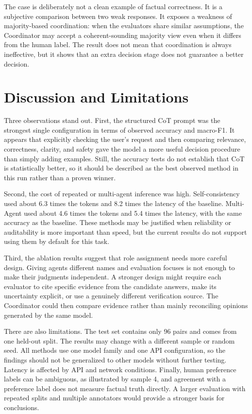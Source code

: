 \documentclass[10pt]{article}
\begin{document}
The case is deliberately not a clean example of factual correctness. It is a subjective comparison between two weak responses. It exposes a weakness of majority-based coordination: when the evaluators share similar assumptions, the Coordinator may accept a coherent-sounding majority view even when it differs from the human label. The result does not mean that coordination is always ineffective, but it shows that an extra decision stage does not guarantee a better decision.

\section{Discussion and Limitations}
Three observations stand out. First, the structured CoT prompt was the strongest single configuration in terms of observed accuracy and macro-F1. It appears that explicitly checking the user's request and then comparing relevance, correctness, clarity, and safety gave the model a more useful decision procedure than simply adding examples. Still, the accuracy tests do not establish that CoT is statistically better, so it should be described as the best observed method in this run rather than a proven winner.

Second, the cost of repeated or multi-agent inference was high. Self-consistency used about 6.3 times the tokens and 8.2 times the latency of the baseline. Multi-Agent used about 4.6 times the tokens and 5.4 times the latency, with the same accuracy as the baseline. These methods may be justified when reliability or auditability is more important than speed, but the current results do not support using them by default for this task.

Third, the ablation results suggest that role assignment needs more careful design. Giving agents different names and evaluation focuses is not enough to make their judgments independent. A stronger design might require each evaluator to cite specific evidence from the candidate answers, make its uncertainty explicit, or use a genuinely different verification source. The Coordinator could then compare evidence rather than mainly reconciling opinions generated by the same model.

There are also limitations. The test set contains only 96 pairs and comes from one held-out split. The results may change with a different sample or random seed. All methods use one model family and one API configuration, so the findings should not be generalized to other models without further testing. Latency is affected by API and network conditions. Finally, human preference labels can be ambiguous, as illustrated by sample 4, and agreement with a preference label does not measure factual truth directly. A larger evaluation with repeated splits and multiple annotators would provide a stronger basis for conclusions.
\end{document}
